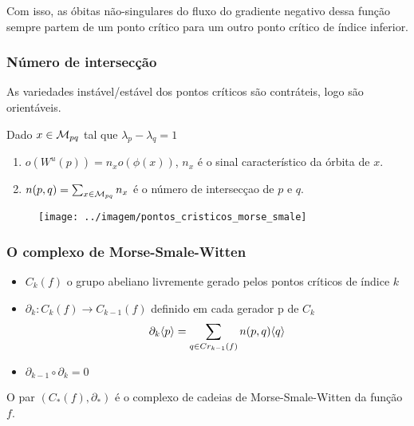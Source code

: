 \documentclass{beamer}
\begin{document}
\begin{footnotesize}
\begin{frame}
		Com isso, as óbitas não-singulares do fluxo do gradiente negativo dessa função sempre partem de um ponto crítico para um outro ponto crítico de índice inferior.

				
	\end{frame}
	
	\begin{frame}
		\frametitle{Número de intersecção}
		As variedades instável/estável dos pontos críticos são contráteis, logo são orientáveis.
		
		\begin{definicao}
			Dado $x \in \mathcal{M}_{pq}$ tal que $\lambda_{p}-\lambda_{q} = 1$
			
			\begin{enumerate}
				\item $o(W^{u}(p)) = n_{x}o(\phi(x))$, $n_{x}$ é o sinal característico da órbita de $x$.
				
				\item $n(p,q) = \sum_{x \in \mathcal{M}_{pq} }n_{x}$ é o número de intersecçao de $p$ e $q$.
			\end{enumerate}
			
		\end{definicao}
		\begin{figure}
			\centering
			\textbf{}\par
			\texttt{[image: ../imagem/pontos\_cristicos\_morse\_smale]}
		\end{figure}
	\end{frame}
	
	\begin{frame}
		\frametitle{O complexo de Morse-Smale-Witten}
		\begin{definicao}
			\begin{itemize}
				\item $C_{k}(f)$ o grupo abeliano livremente gerado pelos pontos críticos de índice $k$ 
				
				\item 
				$\partial_{k}: C_{k}(f)\to C_{k-1}(f)$ definido em cada gerador p de $C_{k}$
				$$
				\partial_{k}\langle p\rangle=\sum_{q \in Cr_{k-1}(f)}n(p,q)\langle q\rangle
				$$
				
				\item $\partial_{k-1}\circ \partial_{k}  =0$
			\end{itemize}
			O par $(C_{*}(f), \partial_{*})$ é o complexo de cadeias de Morse-Smale-Witten  da função $f$.
		\end{definicao}
		

\end{frame}
\end{footnotesize}
\end{document}
